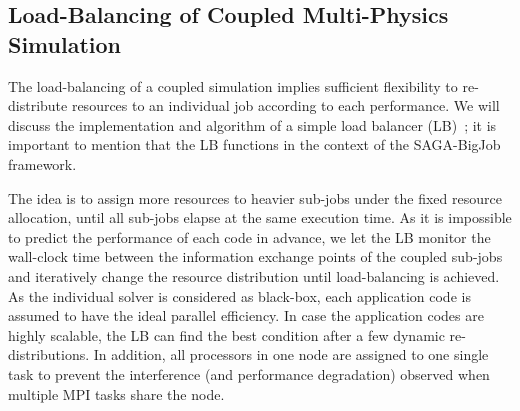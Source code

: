 \documentclass[preprint,12pt]{elsarticle}
\newcommand{\skonote}[1]{ {\textcolor{green} { ***Jeff: #1 }}}
\newcommand{\skonote}[1]{}
\begin{document}
\subsection{Load-Balancing of Coupled Multi-Physics Simulation}
\label{sec:computational_LoadBalancing}
The load-balancing of a coupled simulation implies sufficient flexibility to re-distribute resources to an individual job according to each performance. We will discuss the implementation and algorithm of a simple load balancer (LB)~\cite{Ko}; it is important to mention that the LB functions in the context of the SAGA-BigJob framework.

The idea is to assign more resources to heavier sub-jobs under the fixed resource allocation, until all sub-jobs elapse at the same execution time. As it is impossible to predict the performance of each code in advance, we let the LB monitor the wall-clock time between the information exchange points of the coupled sub-jobs and iteratively change the resource distribution until load-balancing is achieved. As the individual solver is considered as black-box, each application code is assumed to have the ideal parallel efficiency. In case the application codes are highly scalable, the LB can find the best condition after a few dynamic re-distributions. In addition, all processors in one node are assigned to one single task to prevent the interference (and performance degradation) observed when multiple MPI tasks share the node.


\end{document}
